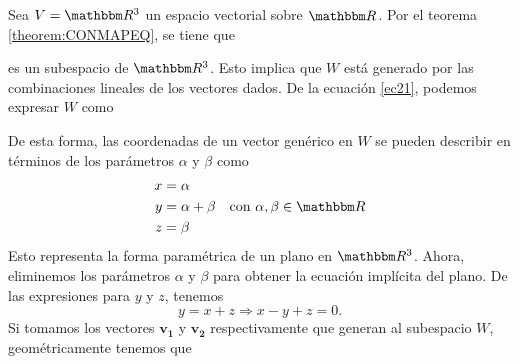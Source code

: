 \begin{examplebox}{}{}
    Sea $V = \RR[3]$ un espacio vectorial sobre $\RR$. Por el teorema \ref{theorem:CONMAPEQ}, se tiene que
    \begin{matriz}
         \label{ec21}
    \end{matriz}
    es un subespacio de $\RR[3]$. Esto implica que $W$ está generado por las combinaciones lineales de los vectores dados. De la ecuación \eqref{ec21}, podemos expresar $W$ como
    \begin{matrizn}
    \end{matrizn}
    De esta forma, las coordenadas de un vector genérico en $W$ se pueden describir en términos de los parámetros $\alpha$ y $\beta$ como
    $$\begin{aligned}
        x & = \alpha \\
        y & = \alpha + \beta \\
        z & = \beta
    \end{aligned} \quad \text{con } \alpha, \beta \in \RR$$
    Esto representa la forma paramétrica de un plano en $\RR[3]$. Ahora, eliminemos los parámetros $\alpha$ y $\beta$ para obtener la ecuación implícita del plano. De las expresiones para $y$ y $z$, tenemos
    $$y = x + z \Longrightarrow x - y + z = 0.$$
    Si tomamos los vectores $\mathbf{v_1}$ y $\mathbf{v_2}$ respectivamente que generan al subespacio $W$, geométricamente tenemos que
    \begin{center}
\end{center}
\end{examplebox}
